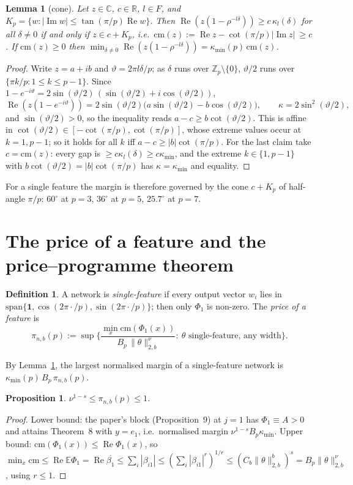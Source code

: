 \documentclass[11pt]{article}
\newtheorem{lemma}[theorem]{Lemma}
\newtheorem{proposition}[theorem]{Proposition}
\theoremstyle{definition}
\newtheorem{definition}[theorem]{Definition}
\newcommand{\E}{\mathbb{E}}
\renewcommand{\Re}{\operatorname{Re}}
\renewcommand{\Im}{\operatorname{Im}}
\begin{document}
\begin{lemma}[cone]\label{lem:cone}
Let $z\in\mathbb C$, $c\in\mathbb R$, $l\in F$, and $K_p=\{w:|\Im w|\le\tan(\pi/p)\Re w\}$.  Then
$\Re(z(1-\rho^{-l\delta}))\ge c\,\kappa_l(\delta)$ for all $\delta\ne0$ if and only if $z\in c+K_p$, i.e.\
$\mathrm{cm}(z):=\Re z-\cot(\pi/p)|\Im z|\ \ge c$.  If $\mathrm{cm}(z)\ge0$ then
$\min_{\delta\ne0}\Re(z(1-\rho^{-l\delta}))=\kappa_{\min}(p)\,\mathrm{cm}(z)$.
\end{lemma}
\begin{proof}
Write $z=a+ib$ and $\vartheta=2\pi l\delta/p$; as $\delta$ runs over $\mathbb Z_p\setminus\{0\}$, $\vartheta/2$ runs over
$\{\pi k/p:1\le k\le p-1\}$.  Since $1-e^{-i\vartheta}=2\sin(\vartheta/2)\,(\sin(\vartheta/2)+i\cos(\vartheta/2))$,
\[\Re(z(1-e^{-i\vartheta}))=2\sin(\vartheta/2)\big(a\sin(\vartheta/2)-b\cos(\vartheta/2)\big),\qquad
\kappa=2\sin^2(\vartheta/2),\]
and $\sin(\vartheta/2)>0$, so the inequality reads $a-c\ge b\cot(\vartheta/2)$.  This is affine in
$\cot(\vartheta/2)\in[-\cot(\pi/p),\cot(\pi/p)]$, whose extreme values occur at $k=1,p-1$; so it holds for all $k$ iff
$a-c\ge|b|\cot(\pi/p)$.  For the last claim take $c=\mathrm{cm}(z)$: every gap is $\ge c\kappa_l(\delta)\ge c\kappa_{\min}$,
and the extreme $k\in\{1,p-1\}$ with $b\cot(\vartheta/2)=|b|\cot(\pi/p)$ has $\kappa=\kappa_{\min}$ and equality.
\end{proof}

For a single feature the margin is therefore governed by the cone $c+K_p$ of half-angle $\pi/p$: $60^\circ$ at $p=3$,
$36^\circ$ at $p=5$, $25.7^\circ$ at $p=7$.

\section{The price of a feature and the price--programme theorem}
\begin{definition}
A network is \emph{single-feature} if every output vector $w_i$ lies in
$\mathrm{span}\{\mathbf 1,\cos(2\pi\cdot/p),\sin(2\pi\cdot/p)\}$; then only $\Phi_1$ is non-zero.  The \emph{price of a
feature} is
\[
\pi_{n,b}(p):=\sup\Big\{\frac{\min_x\mathrm{cm}(\Phi_1(x))}{B_p\,\|\theta\|_{2,b}^{\nu}}:\ \theta\text{ single-feature,
any width}\Big\}.
\]
\end{definition}
By Lemma~\ref{lem:cone}, the largest normalised margin of a single-feature network is
$\kappa_{\min}(p)\,B_p\,\pi_{n,b}(p)$.

\begin{proposition}\label{prop:range}
$\nu^{1-s}\le\pi_{n,b}(p)\le1$.
\end{proposition}
\begin{proof}
Lower bound: the paper's block (Proposition~9) at $j=1$ has $\Phi_1\equiv A>0$ and attains Theorem~8 with $y=e_1$, i.e.\
normalised margin $\nu^{1-s}B_p\kappa_{\min}$.  Upper bound: $\mathrm{cm}(\Phi_1(x))\le\Re\Phi_1(x)$, so
$\min_x\mathrm{cm}\le\Re\E\Phi_1=\Re\overline{\beta_1}\le\sum_i|\beta_{i1}|\le(\sum_i|\beta_{i1}|^r)^{1/r}
\le(C_b\|\theta\|^b_{2,b})^{s}=B_p\|\theta\|_{2,b}^\nu$, using $r\le1$.
\end{proof}
\end{document}
